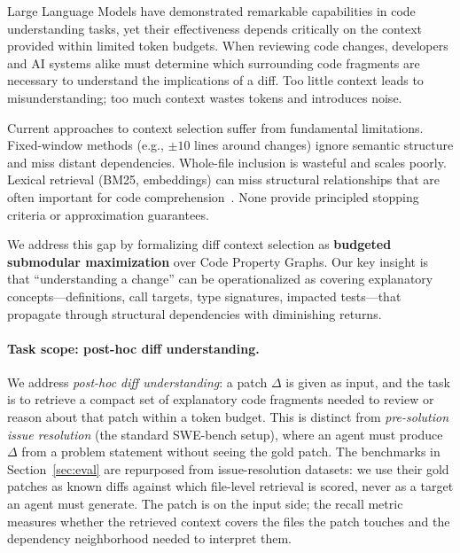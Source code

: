 \documentclass[11pt, a4paper]{article}
\begin{document}
Large Language Models have demonstrated remarkable capabilities in code understanding tasks, yet their effectiveness depends critically on the context provided within limited token budgets. When reviewing code changes, developers and AI systems alike must determine which surrounding code fragments are necessary to understand the implications of a diff. Too little context leads to misunderstanding; too much context wastes tokens and introduces noise.

Current approaches to context selection suffer from fundamental limitations. Fixed-window methods (e.g., $\pm 10$ lines around changes) ignore semantic structure and miss distant dependencies. Whole-file inclusion is wasteful and scales poorly. Lexical retrieval (BM25, embeddings) can miss structural relationships that are often important for code comprehension~\cite{ko2006exploratory, robillard2004effective}. None provide principled stopping criteria or approximation guarantees.

We address this gap by formalizing diff context selection as \textbf{budgeted submodular maximization} over Code Property Graphs. Our key insight is that ``understanding a change'' can be operationalized as covering explanatory concepts---definitions, call targets, type signatures, impacted tests---that propagate through structural dependencies with diminishing returns.

\paragraph{Task scope: post-hoc diff understanding.} We address \emph{post-hoc diff understanding}: a patch $\Delta$ is given as input, and the task is to retrieve a compact set of explanatory code fragments needed to review or reason about that patch within a token budget. This is distinct from \emph{pre-solution issue resolution} (the standard SWE-bench setup), where an agent must produce $\Delta$ from a problem statement without seeing the gold patch. The benchmarks in Section~\ref{sec:eval} are repurposed from issue-resolution datasets: we use their gold patches as known diffs against which file-level retrieval is scored, never as a target an agent must generate. The patch is on the input side; the recall metric measures whether the retrieved context covers the files the patch touches and the dependency neighborhood needed to interpret them.
\end{document}
